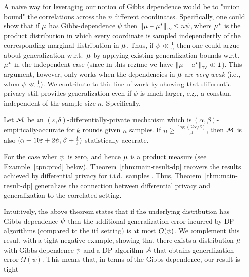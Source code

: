 \documentclass[12pt,a4paper,oneside,onecolumn]{book}
\begin{document}
A naive way for leveraging our notion of Gibbs dependence would be to "union bound" the correlations across the $n$ different coordinates. Specifically, one could show that if $\mu$ has Gibbs-dependence $\psi$ then $\left\lVert\mu - \mu^{*}\right\rVert_{\textup{\tiny\textsf{TV}}}\leq n\psi$, where $\mu^*$ is the product distribution in which every coordinate is sampled independently of the corresponding marginal distribution in $\mu$. 
Thus, if $\psi\ll\frac{1}{n}$ then one could argue about generalization w.r.t.\ $\mu$ by applying existing generalization bounds w.r.t.\ $\mu^*$ in the independent case (since in this regime we have $\left\lVert\mu - \mu^{*}\right\rVert_{\textup{\tiny\textsf{TV}}}\ll1$). This argument, however, only works when the dependencies in $\mu$ are {\em very weak} (i.e., when $\psi\ll\frac{1}{n}$). 
We contribute to this line of work by showing that differential privacy still provides generalization even if $\psi$ is much larger, e.g., a constant independent of the sample size $n$. 
Specifically, 

\begin{theorem}
  \label{thm:main-result-dp}
  Let $\mathcal{M}$ be an $(\varepsilon,\delta)$-differentially-private mechanism
  which is $(\alpha,\beta)$-empirically-accurate for $k$ rounds given $n$ samples. 
  If $n\geq \frac{\log(2k\varepsilon/\delta)}{\varepsilon^2}$, then $\mathcal{M}$ is also
  $(\alpha+10\varepsilon+2\psi,\beta + \frac{\delta}{\varepsilon})$-statistically-accurate.
\end{theorem}

\begin{remark}
For the case when $\psi$ is zero, and hence $\mu$ is a product measure (see Example~\ref{apn:prod} below), Theorem~\ref{thm:main-result-dp} recovers the results achieved by differential privacy for i.i.d.\ samples \cite{dwork2015preserving,bassily2016algorithmic}. Thus, Theorem~\ref{thm:main-result-dp} generalizes the connection between differential privacy and generalization to the correlated setting.
\end{remark}

Intuitively, the above theorem states that if the underlying distribution has Gibbs-dependence $\psi$ then the additional generalization error incurred by DP algorithms (compared to the iid setting) is at most $O(\psi)$. We complement this result with a tight negative example, showing that there exists a distribution $\mu$ with Gibbs-dependence $\psi$ and a DP algorithm $\mathcal{A}$ that obtains generalization error $\Omega(\psi)$. This means that, in terms of the Gibbs-dependence, our result is tight.
\end{document}
